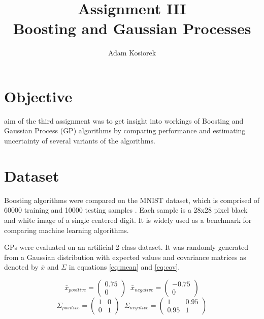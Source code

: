 \documentclass[journal, a4paper]{IEEEtran}
\begin{document}
	\title{Assignment III\\Boosting and Gaussian Processes}
	\author{Adam Kosiorek}	
	\maketitle
	
	
\section{Objective}
     aim of the third assignment was to get insight into workings of Boosting and Gaussian Process (GP) algorithms by comparing performance and estimating uncertainty of several variants of the algorithms.
    
\section{Dataset}
    Boosting algorithms were compared on the MNIST dataset, which is comprised of 60000 training and 10000 testing samples \cite{MNIST}. Each sample is a 28x28 pixel black and white image of a single centered digit. It is widely used as a benchmark for comparing machine learning algorithms. 
    
    GPs were evaluated on an artificial 2-class dataset. It was randomly generated from a Gaussian distribution with expected values and covariance matrices as denoted by $\bar{x}$ and $\Sigma$ in equations \ref{eq:mean} and \ref{eq:cov}.
    
    \begin{equation}
     \bar{x}_{positive} = \begin{pmatrix} 0.75 \\ 0 \end{pmatrix} \;\; 
     \bar{x}_{negative} = \begin{pmatrix} -0.75 \\ 0 \end{pmatrix}
     \label{eq:mean}
    \end{equation}
    \begin{equation}
     \Sigma_{positive} = \begin{pmatrix} 1 & 0 \\ 0 & 1 \end{pmatrix} \;\; 
     \Sigma_{negative} = \begin{pmatrix} 1 & 0.95 \\ 0.95 & 1 \end{pmatrix}
     \label{eq:cov}
    \end{equation}
\end{document}
